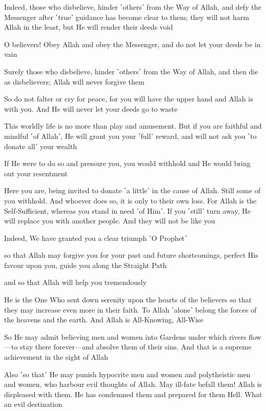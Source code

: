 Indeed, those who disbelieve, hinder ˹others˺ from the Way of Allah, and defy the Messenger after ˹true˺ guidance has become clear to them; they will not harm Allah in the least, but He will render their deeds void

O believers! Obey Allah and obey the Messenger, and do not let your deeds be in vain

Surely those who disbelieve, hinder ˹others˺ from the Way of Allah, and then die as disbelievers; Allah will never forgive them

So do not falter or cry for peace, for you will have the upper hand and Allah is with you. And He will never let your deeds go to waste

This worldly life is no more than play and amusement. But if you are faithful and mindful ˹of Allah˺, He will grant you your ˹full˺ reward, and will not ask you ˹to donate all˺ your wealth

If He were to do so and pressure you, you would withhold and He would bring out your resentment

Here you are, being invited to donate ˹a little˺ in the cause of Allah. Still some of you withhold. And whoever does so, it is only to their own loss. For Allah is the Self-Sufficient, whereas you stand in need ˹of Him˺. If you ˹still˺ turn away, He will replace you with another people. And they will not be like you

Indeed, We have granted you a clear triumph ˹O Prophet˺

so that Allah may forgive you for your past and future shortcomings, perfect His favour upon you, guide you along the Straight Path

and so that Allah will help you tremendously

He is the One Who sent down serenity upon the hearts of the believers so that they may increase even more in their faith. To Allah ˹alone˺ belong the forces of the heavens and the earth. And Allah is All-Knowing, All-Wise

So He may admit believing men and women into Gardens under which rivers flow—to stay there forever—and absolve them of their sins. And that is a supreme achievement in the sight of Allah

Also ˹so that˺ He may punish hypocrite men and women and polytheistic men and women, who harbour evil thoughts of Allah. May ill-fate befall them! Allah is displeased with them. He has condemned them and prepared for them Hell. What an evil destination

